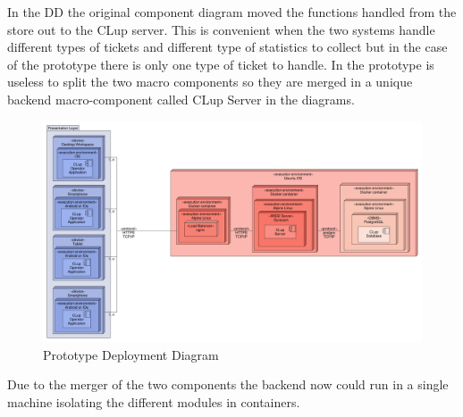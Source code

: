 \pagebreak

In the DD the original component diagram moved the functions handled from the store out to the CLup server. This is convenient when the two systems handle different types of tickets and different type of statistics to collect but in the case of the prototype there is only one type of ticket to handle. In the prototype is useless to split the two macro components so they are merged in a unique backend macro-component called CLup Server in the diagrams. 
\begin{figure}[h!t]
    \centering
    \includegraphics[width=\textwidth]{Images/UML_deployment_diagram.pdf}
    \caption{\label{fig:General Component}Prototype Deployment Diagram}
\end{figure}

Due to the merger of the two components the backend now could run in a single machine isolating the different modules in containers. 



